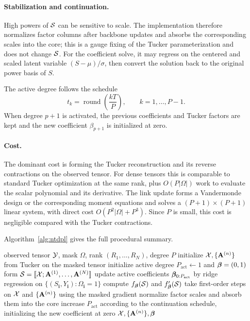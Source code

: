 \paragraph{Stabilization and continuation.}
High powers of \(\mathcal{S}\) can be sensitive to scale. The implementation therefore
normalizes factor columns after backbone updates and absorbs the corresponding
scales into the core; this is a gauge fixing of the Tucker parameterization and
does not change \(\mathcal{S}\). For the coefficient solve, it may regress on the
centered and scaled latent variable \((S-\mu)/\sigma\), then convert the
solution back to the original power basis of \(S\).

The active degree follows the schedule
\[
  t_k = \operatorname{round}\left(\frac{kT}{P}\right),
  \qquad k=1,\ldots,P-1.
\]
When degree \(p+1\) is activated, the previous coefficients and Tucker factors
are kept and the new coefficient \(\beta_{p+1}\) is initialized at zero.

\paragraph{Cost.}
The dominant cost is forming the Tucker reconstruction and its reverse
contractions on the observed tensor. For dense tensors this is comparable to
standard Tucker optimization at the same rank, plus \(O(P|\Omega|)\) work to
evaluate the scalar polynomial and its derivative. The link update forms a
Vandermonde design or the corresponding moment equations and solves a
\((P+1)\times(P+1)\) linear system, with direct cost
\(O(P^2|\Omega|+P^3)\). Since \(P\) is small, this cost is negligible compared
with the Tucker contractions.

Algorithm~\ref{alg:ntdpl} gives the full procedural summary.

\begin{algorithm}[H]
  \caption{Masked NTD-PL optimization}
  \label{alg:ntdpl}
  \begin{algorithmic}[1]
    \Require observed tensor \(\mathcal{Y}\), mask \(\Omega\), rank \((R_1,\ldots,R_N)\), degree \(P\)
    \State initialize \(\mathcal{X},\{\mathbf{A}^{(n)}\}\) from Tucker on the masked tensor
    \State initialize active degree \(P_{\mathrm{act}}\leftarrow 1\) and
    \(\boldsymbol{\beta}=(0,1)\)
      \State form \(\mathcal{S}=\llbracket \mathcal{X}; \mathbf{A}^{(1)},\ldots,\mathbf{A}^{(N)} \rrbracket\)
        \State update active coefficients
        \(\boldsymbol{\beta}_{0:P_{\mathrm{act}}}\) by ridge regression on
        \(\{(S_{\mathbf i},Y_{\mathbf i}):\Omega_{\mathbf i}=1\}\)
      \EndIf
      \State compute \(f_{\boldsymbol{\beta}}(\mathcal{S})\) and \(f_{\boldsymbol{\beta}}'(\mathcal{S})\)
      \State take first-order steps on \(\mathcal{X}\) and \(\{\mathbf{A}^{(n)}\}\) using
      the masked gradient
      \State normalize factor scales and absorb them into the core
      \State increase \(P_{\mathrm{act}}\) according to the continuation schedule,
      initializing the new coefficient at zero
    \EndFor
    \State \Return \(\mathcal{X},\{\mathbf{A}^{(n)}\},\boldsymbol{\beta}\)
  \end{algorithmic}
\end{algorithm}
